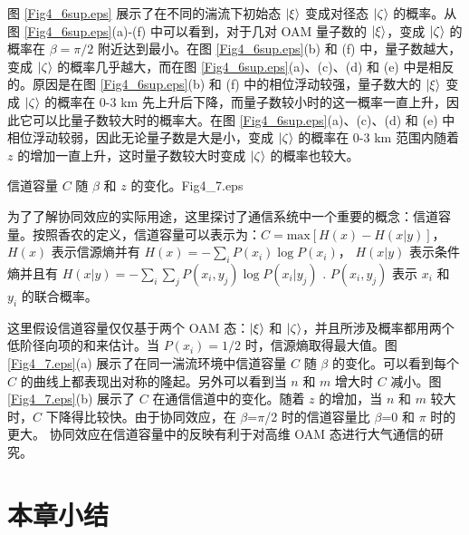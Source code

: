 \documentclass[master]{thesis-uestc}
\begin{document}
图 \ref{Fig4_6sup.eps} 展示了在不同的湍流下初始态 $\ket{\xi}$ 变成对径态 $\ket{\zeta}$ 的概率。从图 \ref{Fig4_6sup.eps}(a)-(f) 中可以看到，对于几对 OAM 量子数的 $\ket{\xi}$，变成 $\ket{\zeta}$ 的概率在 $\beta=\pi/2$ 附近达到最小。在图 \ref{Fig4_6sup.eps}(b) 和 (f) 中，量子数越大，变成 $\ket{\zeta}$ 的概率几乎越大，而在图 \ref{Fig4_6sup.eps}(a)、(c)、(d) 和 (e) 中是相反的。原因是在图 \ref{Fig4_6sup.eps}(b) 和 (f) 中的相位浮动较强，量子数大的 $\ket{\xi}$ 变成 $\ket{\zeta}$ 的概率在 0-3 km 先上升后下降，而量子数较小时的这一概率一直上升，因此它可以比量子数较大时的概率大。在图 \ref{Fig4_6sup.eps}(a)、(c)、(d) 和 (e) 中相位浮动较弱，因此无论量子数是大是小，变成 $\ket{\zeta}$ 的概率在 0-3 km 范围内随着 $z$ 的增加一直上升，这时量子数较大时变成 $\ket{\zeta}$ 的概率也较大。

\begin{pics}[H]{信道容量 $C$ 随 $\beta$ 和 $z$ 的变化。}{Fig4_7.eps}
\end{pics}

为了了解协同效应的实际用途，这里探讨了通信系统中一个重要的概念：信道容量。按照香农的定义，信道容量可以表示为：$C=\mathrm{max}\left[H(x)-H(x|y)\right]$，$H(x)$ 表示信源熵并有 $H(x)=-\sum_{i}P(x_i)\log P(x_i)$， $H(x|y)$ 表示条件熵并且有 $H(x|y)= -\sum_{i}\sum_{j}P(x_i,y_j)\log P(x_i|y_j)$ . $P(x_i,y_j)$ 表示 $x_i$ 和 $y_i$ 的联合概率。

这里假设信道容量仅仅基于两个 OAM 态：$\ket{\xi}$ 和 $\ket{\zeta}$，并且所涉及概率都用两个低阶径向项的和来估计。当 $P(x_i)=1/2$ 时，信源熵取得最大值。图 \ref{Fig4_7.eps}(a) 展示了在同一湍流环境中信道容量 $C$ 随 $\beta$ 的变化。可以看到每个 $C$ 的曲线上都表现出对称的隆起。另外可以看到当 $n$ 和 $m$ 增大时 $C$ 减小。图 \ref{Fig4_7.eps}(b) 展示了 $C$ 在通信信道中的变化。随着 $z$ 的增加，当 $n$ 和 $m$ 较大时，$C$ 下降得比较快。由于协同效应，在 $\beta$=$\pi$/2 时的信道容量比 $\beta$=0 和 $\pi$ 时的更大。 协同效应在信道容量中的反映有利于对高维 OAM 态进行大气通信的研究。

\section{本章小结}
\end{document}
